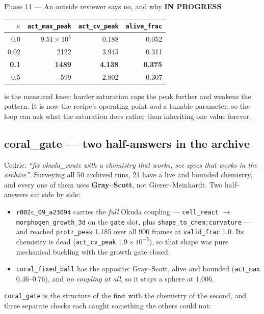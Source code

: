 \documentclass[11pt,a4paper]{article}
\newcommand{\code}[1]{\texttt{#1}}
\newcommand{\prog}{\textcolor{warn}{\textbf{IN PROGRESS}}}
\begin{document}
\begin{phasebox}{Phase 11 --- An outside reviewer says no, and why \hfill \prog}
\begin{center}\small
\begin{tabular}{@{}rrrr@{}}
\toprule
$\kappa$ & \code{act\_max\_peak} & \code{act\_cv\_peak} & \code{alive\_frac} \\
\midrule
0.0  & $9.51\times10^{5}$ & 0.188 & 0.052 \\
0.02 & 2122 & 3.945 & 0.311 \\
\textbf{0.1} & \textbf{1489} & \textbf{4.138} & \textbf{0.375} \\
0.5  & 599 & 2.802 & 0.307 \\
\bottomrule
\end{tabular}
\end{center}

 is the measured knee: harder saturation caps the peak further and weakens the
pattern. It is now the recipe's operating point \emph{and} a tunable parameter, so the loop can
ask what the saturation does rather than inheriting one value forever.

\subsection*{coral\_gate --- two half-answers in the archive}
Cedric: \emph{``fix okuda\_route with a chemistry that works, see specs that works in the
archive''}. Surveying all 50 archived runs, 21 have a live and bounded chemistry, and every one of
them uses \textbf{Gray--Scott}, not Gierer--Meinhardt. Two half-answers sat side by side:

\begin{itemize}\itemsep2pt
\item \code{r002c\_09\_a23094} carries the \emph{full} Okuda coupling --- \code{cell\_react} $\to$
      \code{morphogen\_growth\_3d} on the \code{gate} slot, plus \code{shape\_to\_chem:curvature}
      --- and reached \code{protr\_peak} 1.185 over all 900 frames at \code{valid\_frac} 1.0. Its
      chemistry is dead (\code{act\_cv\_peak} $1.9\times10^{-5}$), so that shape was pure
      mechanical buckling with the growth gate closed.
\item \code{coral\_fixed\_ball} has the opposite: Gray--Scott, alive and bounded
      (\code{act\_max} 0.46--0.76), and \emph{no coupling at all}, so it stays a sphere at 1.006.
\end{itemize}

\noindent \code{coral\_gate} is the structure of the first with the chemistry of the second, and
three separate checks each caught something the others could not:


\end{phasebox}
\end{document}
